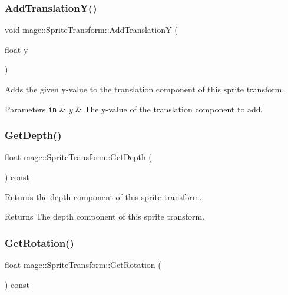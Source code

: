 \subsubsection{\texorpdfstring{Add\+Translation\+Y()}{AddTranslationY()}}
{\footnotesize\ttfamily void mage\+::\+Sprite\+Transform\+::\+Add\+TranslationY (\begin{DoxyParamCaption}\item[{float}]{y }\end{DoxyParamCaption})}

Adds the given y-\/value to the translation component of this sprite transform.


\begin{DoxyParams}[1]{Parameters}
\mbox{\tt in}  & {\em y} & The y-\/value of the translation component to add. \\
\hline
\end{DoxyParams}
\hypertarget{structmage_1_1_sprite_transform_a9dfb5844abddaf3648f887f21db7077d}{}\label{structmage_1_1_sprite_transform_a9dfb5844abddaf3648f887f21db7077d} 
\subsubsection{\texorpdfstring{Get\+Depth()}{GetDepth()}}
{\footnotesize\ttfamily float mage\+::\+Sprite\+Transform\+::\+Get\+Depth (\begin{DoxyParamCaption}{ }\end{DoxyParamCaption}) const}

Returns the depth component of this sprite transform.

\begin{DoxyReturn}{Returns}
The depth component of this sprite transform. 
\end{DoxyReturn}
\hypertarget{structmage_1_1_sprite_transform_a1dda0fe10496d0d04a660c84d9a87efe}{}\label{structmage_1_1_sprite_transform_a1dda0fe10496d0d04a660c84d9a87efe} 
\subsubsection{\texorpdfstring{Get\+Rotation()}{GetRotation()}}
{\footnotesize\ttfamily float mage\+::\+Sprite\+Transform\+::\+Get\+Rotation (\begin{DoxyParamCaption}{ }\end{DoxyParamCaption}) const}

